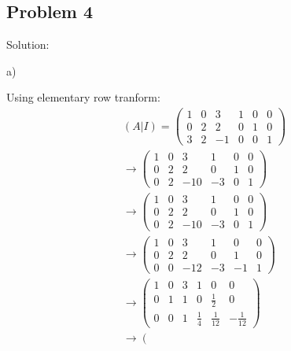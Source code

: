 \documentclass[letterpaper, 11pt]{article}
\newcommand{\1}{\mathds{1}}	%
\theoremstyle{definition}
\begin{document}
\subsection*{Problem 4}

Solution:

a)

Using elementary row tranform:
\begin{align*}
  (A|I) = \left(\begin{array}{ccc|ccc}
                  1 & 0 & 3  & 1 & 0 & 0 \\
                  0 & 2 & 2  & 0 & 1 & 0 \\
                  3 & 2 & -1 & 0 & 0 & 1
                \end{array}\right)                              \\
  \to \left(\begin{array}{ccc|ccc}
              1 & 0 & 3   & 1  & 0 & 0 \\
              0 & 2 & 2   & 0  & 1 & 0 \\
              0 & 2 & -10 & -3 & 0 & 1
            \end{array}\right)                                \\
  \to \left(\begin{array}{ccc|ccc}
              1 & 0 & 3   & 1  & 0 & 0 \\
              0 & 2 & 2   & 0  & 1 & 0 \\
              0 & 2 & -10 & -3 & 0 & 1
            \end{array}\right)                                \\
  \to \left(\begin{array}{ccc|ccc}
              1 & 0 & 3   & 1  & 0  & 0 \\
              0 & 2 & 2   & 0  & 1  & 0 \\
              0 & 0 & -12 & -3 & -1 & 1
            \end{array}\right)                               \\
  \to \left(\begin{array}{ccc|ccc}
              1 & 0 & 3 & 1           & 0            & 0             \\
              0 & 1 & 1 & 0           & \frac{1}{2}  & 0             \\
              0 & 0 & 1 & \frac{1}{4} & \frac{1}{12} & -\frac{1}{12}
            \end{array}\right)  \\
  \to \left(\begin{array}{ccc|ccc}

\end{array}
\end{align*}
\end{document}
